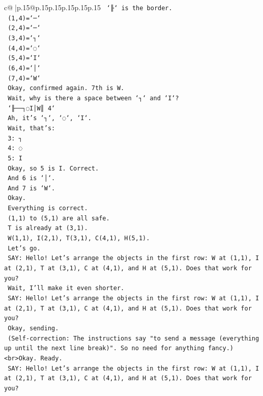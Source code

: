 \documentclass{article}
\begin{document}
{\begin{supertabular}{c@{$\;$}|p{.15\linewidth}@{}p{.15\linewidth}p{.15\linewidth}p{.15\linewidth}p{.15\linewidth}p{.15\linewidth}}
{{{\texttt{    `╟` is the border.} \\
\texttt{    (1,4)=`─`} \\
\texttt{    (2,4)=`─`} \\
\texttt{    (3,4)=`┐`} \\
\texttt{    (4,4)=`◌`} \\
\texttt{    (5,4)=`I`} \\
\texttt{    (6,4)=`│`} \\
\texttt{    (7,4)=`W`} \\
\texttt{    Okay, confirmed again. 7th is W.} \\
\texttt{    Wait, why is there a space between `┐` and `I`?} \\
\texttt{    `╟──┐◌I│W║ 4`} \\
\texttt{    Ah, it's `┐`, `◌`, `I`.} \\
\texttt{    Wait, that's:} \\
\texttt{    3: ┐} \\
\texttt{    4: ◌} \\
\texttt{    5: I} \\
\texttt{    Okay, so 5 is I. Correct.} \\
\texttt{    And 6 is `│`.} \\
\texttt{    And 7 is `W`.} \\
\texttt{    Okay.} \\
\texttt{    Everything is correct.} \\
\texttt{    (1,1) to (5,1) are all safe.} \\
\texttt{    T is already at (3,1).} \\
\texttt{    W(1,1), I(2,1), T(3,1), C(4,1), H(5,1).} \\
\texttt{    Let's go.} \\
\texttt{    SAY: Hello! Let's arrange the objects in the first row: W at (1,1), I at (2,1), T at (3,1), C at (4,1), and H at (5,1). Does that work for you?} \\
\texttt{    Wait, I'll make it even shorter.} \\
\texttt{    SAY: Hello! Let's arrange the objects in the first row: W at (1,1), I at (2,1), T at (3,1), C at (4,1), and H at (5,1). Does that work for you?} \\
\texttt{    Okay, sending.} \\
\texttt{    (Self{-}correction: The instructions say "to send a message (everything up until the next line break)". So no need for anything fancy.)<br>Okay. Ready.} \\
\texttt{    SAY: Hello! Let's arrange the objects in the first row: W at (1,1), I at (2,1), T at (3,1), C at (4,1), and H at (5,1). Does that work for you?} \\
}}}
\end{supertabular}}
\end{document}
